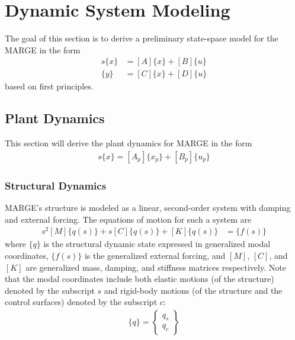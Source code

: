 \chapter{Dynamic System Modeling}
\label{ch:sysModeling}

The goal of this section is to derive a preliminary state-space model for the MARGE in the form
\begin{equation}
\label{eq:modelingGoal}
	\begin{aligned}
    		s \{x\} &= [A] \{x\} + [B]\{u\} \\
	    \{y\} &= [C] \{x\} + [D] \{u\}
	\end{aligned}
\end{equation}
based on first principles.

\section{Plant Dynamics} %

This section will derive the plant dynamics for MARGE in the form
\begin{align}
	\label{eq:ssPlant}
	s \{x\} = [A_p]\{x_p\}+[B_p]\{u_p\}
\end{align}

\subsection{Structural Dynamics} %

MARGE's structure is modeled as a linear, second-order system with damping and external forcing. The equations of motion for such a system are
\begin{align}
    s^2 [M] \{q(s)\} + s [C] \{q(s)\} + [K] \{q(s)\} &= \{f(s)\}
\end{align}
where $\{q\}$ is the structural dynamic state expressed in generalized modal coordinates, $\{f(s)\}$ is the generalized external forcing, and $[M]$, $[C]$, and $[K]$ are generalized mass, damping, and stiffness matrices respectively. Note that the modal coordinates include both elastic motions (of the structure) denoted by the subscript $s$ and rigid-body motions (of the structure and the control surfaces) denoted by the subscript $c$:
\begin{align}
    \{q\} = \begin{Bmatrix} q_{s} \\ q_{c} \end{Bmatrix}
\end{align}

